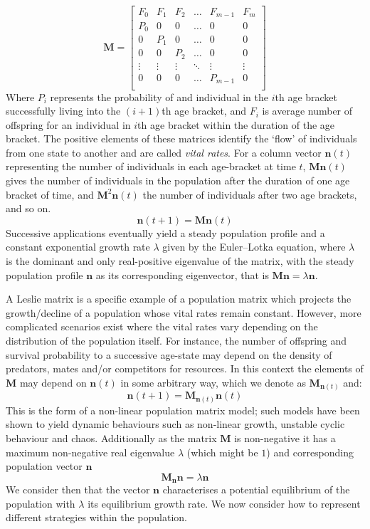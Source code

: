 \begin{equation*}
\mathbf{M}=\begin{bmatrix}
    F_0 & F_1 & F_2 & \dots & F_{m-1} & F_m  \\
    P_0 &  0  &  0  & \dots &  0      &  0   \\
     0  & P_1 &  0  & \dots &  0      &  0   \\
     0  &  0  & P_2 & \dots &  0      &  0   \\
    \vdots & \vdots & \vdots & \ddots & \vdots & \vdots \\
     0  &  0  &  0  & \dots  & P_{m-1} &  0   \\
\end{bmatrix}
\end{equation*}
Where $P_i$ represents the probability of and individual in the $i$th age bracket successfully living into the $(i+1)$th age bracket, and $F_i$ is average number of offspring for an individual in $i$th age bracket within the duration of the age bracket.
The positive elements of these matrices identify the `flow' of individuals from one state to another and are called \textit{vital rates}.
For a column vector $\mathbf{n}(t)$ representing the number of individuals in each age-bracket at time $t$, $\mathbf{M}\mathbf{n}(t)$ gives the number of individuals in the population after the duration of one age bracket of time, and $\mathbf{M}^2\mathbf{n}(t)$ the number of individuals after two age brackets, and so on. $$\mathbf{n}(t+1)=\mathbf{M}\mathbf{n}(t)$$
Successive applications eventually yield a steady population profile and a constant exponential growth rate $\lambda$ given by the Euler–Lotka equation, where $\lambda$ is the dominant and only real-positive eigenvalue of the matrix, with the steady population profile $\mathbf{n}$ as its corresponding eigenvector, that is $\mathbf{M}\mathbf{n}=\lambda \mathbf{n}$.

A Leslie matrix is a specific example of a population matrix which projects the growth/decline of a population whose vital rates remain constant.
However, more complicated scenarios exist where the vital rates vary depending on the distribution of the population itself.
For instance, the number of offspring and survival probability to a successive age-state may depend on the density of predators, mates and/or competitors for resources.
In this context the elements of $\mathbf{M}$ may depend on $\mathbf{n}(t)$ in some arbitrary way, which we denote as $\mathbf{M}_{\mathbf{n}(t)}$ and:
$$\mathbf{n}(t+1) = \mathbf{M}_{\mathbf{n}(t)}\mathbf{n}(t)$$
This is the form of a non-linear population matrix model; such models have been shown to yield dynamic behaviours such as non-linear growth, unstable cyclic behaviour and chaos.
Additionally as the matrix $\mathbf{M}$ is non-negative it has a maximum non-negative real eigenvalue $\lambda$ (which might be $1$) and corresponding population vector $\mathbf{n}$
$$\mathbf{M}_{\mathbf{n}}\mathbf{n} = \lambda\mathbf{n}$$
We consider then that the vector $\mathbf{n}$ characterises a potential equilibrium of the population with $\lambda$ its equilibrium growth rate. We now consider how to represent different strategies within the population.

